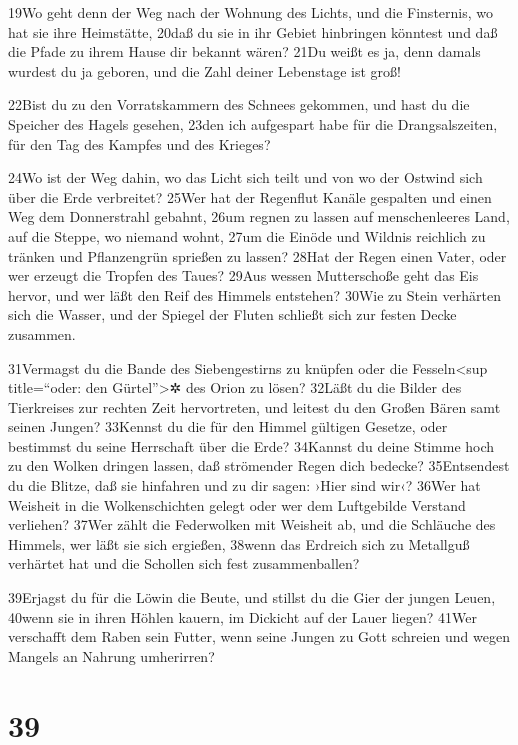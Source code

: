 19Wo geht denn der Weg nach der Wohnung des Lichts, und die Finsternis,
wo hat sie ihre Heimstätte, 20daß du sie in ihr Gebiet hinbringen
könntest und daß die Pfade zu ihrem Hause dir bekannt wären? 21Du weißt
es ja, denn damals wurdest du ja geboren, und die Zahl deiner Lebenstage
ist groß!

22Bist du zu den Vorratskammern des Schnees gekommen, und hast du die
Speicher des Hagels gesehen, 23den ich aufgespart habe für die
Drangsalszeiten, für den Tag des Kampfes und des Krieges?

24Wo ist der Weg dahin, wo das Licht sich teilt und von wo der Ostwind
sich über die Erde verbreitet? 25Wer hat der Regenflut Kanäle gespalten
und einen Weg dem Donnerstrahl gebahnt, 26um regnen zu lassen auf
menschenleeres Land, auf die Steppe, wo niemand wohnt, 27um die Einöde
und Wildnis reichlich zu tränken und Pflanzengrün sprießen zu lassen?
28Hat der Regen einen Vater, oder wer erzeugt die Tropfen des Taues?
29Aus wessen Mutterschoße geht das Eis hervor, und wer läßt den Reif des
Himmels entstehen? 30Wie zu Stein verhärten sich die Wasser, und der
Spiegel der Fluten schließt sich zur festen Decke zusammen.

31Vermagst du die Bande des Siebengestirns zu knüpfen oder die
Fesseln\textless sup title=``oder: den Gürtel''\textgreater✲ des Orion
zu lösen? 32Läßt du die Bilder des Tierkreises zur rechten Zeit
hervortreten, und leitest du den Großen Bären samt seinen Jungen?
33Kennst du die für den Himmel gültigen Gesetze, oder bestimmst du seine
Herrschaft über die Erde? 34Kannst du deine Stimme hoch zu den Wolken
dringen lassen, daß strömender Regen dich bedecke? 35Entsendest du die
Blitze, daß sie hinfahren und zu dir sagen: ›Hier sind wir‹? 36Wer hat
Weisheit in die Wolkenschichten gelegt oder wer dem Luftgebilde Verstand
verliehen? 37Wer zählt die Federwolken mit Weisheit ab, und die
Schläuche des Himmels, wer läßt sie sich ergießen, 38wenn das Erdreich
sich zu Metallguß verhärtet hat und die Schollen sich fest
zusammenballen?

39Erjagst du für die Löwin die Beute, und stillst du die Gier der jungen
Leuen, 40wenn sie in ihren Höhlen kauern, im Dickicht auf der Lauer
liegen? 41Wer verschafft dem Raben sein Futter, wenn seine Jungen zu
Gott schreien und wegen Mangels an Nahrung umherirren?

\hypertarget{section-38}{%
\section{39}\label{section-38}}

